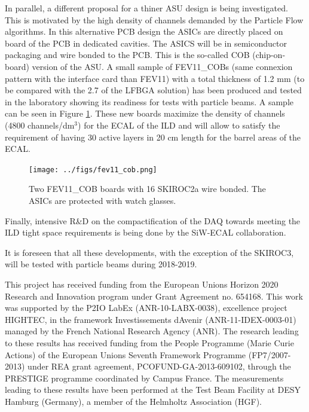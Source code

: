 \documentclass[a4paper,11pt]{article}
\begin{document}
In parallel, a different proposal for a thiner ASU
design is being investigated. This is motivated by the high density of channels
demanded by the Particle Flow algorithms. 
In this alternative PCB design the ASICs
are directly placed on board of the PCB in dedicated cavities.
The ASICS will be in semiconductor packaging and wire bonded to the PCB. This is the so-called COB (chip-on-board) version of the ASU.
A small sample of FEV11\_COBs (same connexion pattern with the interface card than FEV11)
with a total thickness of 1.2 mm (to be compared with the 2.7 of the LFBGA solution)
has been produced and tested in the laboratory
showing its readiness for tests with particle beams. A sample can be seen in Figure \ref{cob}.
These new boards maximize the density of channels (4800 channels/dm$^{3}$) for the ECAL of the ILD
and will allow to satisfy the requirement of having 30 active layers in 20 cm length
for the barrel areas of the ECAL.

\begin{figure}[!t]
  \centering
    \texttt{[image: ../figs/fev11\_cob.png]} 
  \caption{Two FEV11\_COB boards with 16 SKIROC2a wire bonded. The ASICs are protected with watch glasses.}
\label{cob}
\end{figure}

Finally, intensive R\&D on the compactification of
the DAQ towards meeting the ILD tight space requirements is being done by the SiW-ECAL collaboration.

It is foreseen that all these developments, with the exception of the SKIROC3, will be tested with particle beams during 2018-2019.


\acknowledgments

This project has received funding from the European Union{\textquotesingle}s Horizon 2020 Research and Innovation program under Grant Agreement no. 654168.
This work was supported by the P2IO LabEx (ANR-10-LABX-0038), excellence project HIGHTEC,
in the framework {\textquotesingle}Investissements d{\textquotesingle}Avenir{\textquotesingle}
(ANR-11-IDEX-0003-01) managed by the French National Research Agency (ANR).
The research leading to these results has received funding from the People Programme (Marie
Curie Actions) of the European Union{\textquotesingle}s Seventh Framework Programme (FP7/2007-2013)
under REA grant agreement, PCOFUND-GA-2013-609102, through the PRESTIGE
programme coordinated by Campus France.
The measurements leading to these results have been performed at the Test Beam Facility at DESY Hamburg (Germany), a member of the Helmholtz Association (HGF).
\end{document}
